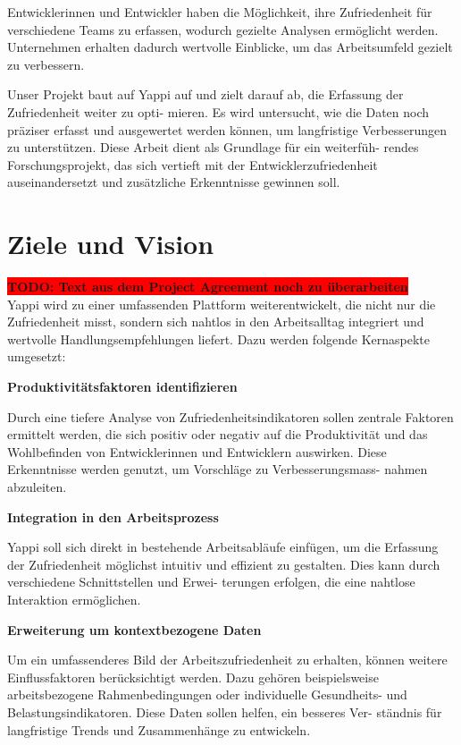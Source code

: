 \documentclass[12pt,a4paper]{report}
\newcommand{\todo}[1]{\colorbox{red}{\textbf{TODO: #1}}\\}
\begin{document}
Entwicklerinnen und Entwickler haben die Möglichkeit, ihre Zufriedenheit für verschiedene Teams zu
erfassen, wodurch gezielte Analysen ermöglicht werden. Unternehmen erhalten dadurch wertvolle
Einblicke, um das Arbeitsumfeld gezielt zu verbessern.

Unser Projekt baut auf Yappi auf und zielt darauf ab, die Erfassung der Zufriedenheit weiter zu opti-
mieren. Es wird untersucht, wie die Daten noch präziser erfasst und ausgewertet werden können,
um langfristige Verbesserungen zu unterstützen. Diese Arbeit dient als Grundlage für ein weiterfüh-
rendes Forschungsprojekt, das sich vertieft mit der Entwicklerzufriedenheit auseinandersetzt und
zusätzliche Erkenntnisse gewinnen soll.

\section{Ziele und Vision}

\todo{Text aus dem Project Agreement noch zu überarbeiten}

Yappi wird zu einer umfassenden Plattform weiterentwickelt, die nicht nur die Zufriedenheit misst,
sondern sich nahtlos in den Arbeitsalltag integriert und wertvolle Handlungsempfehlungen liefert.
Dazu werden folgende Kernaspekte umgesetzt:

\textbf{Produktivitätsfaktoren identifizieren}

Durch eine tiefere Analyse von Zufriedenheitsindikatoren sollen zentrale Faktoren ermittelt werden,
die sich positiv oder negativ auf die Produktivität und das Wohlbefinden von Entwicklerinnen und
Entwicklern auswirken. Diese Erkenntnisse werden genutzt, um Vorschläge zu Verbesserungsmass-
nahmen abzuleiten.

\textbf{Integration in den Arbeitsprozess}

Yappi soll sich direkt in bestehende Arbeitsabläufe einfügen, um die Erfassung der Zufriedenheit
möglichst intuitiv und effizient zu gestalten. Dies kann durch verschiedene Schnittstellen und Erwei-
terungen erfolgen, die eine nahtlose Interaktion ermöglichen.

\textbf{Erweiterung um kontextbezogene Daten}

Um ein umfassenderes Bild der Arbeitszufriedenheit zu erhalten, können weitere Einflussfaktoren
berücksichtigt werden. Dazu gehören beispielsweise arbeitsbezogene Rahmenbedingungen oder
individuelle Gesundheits- und Belastungsindikatoren. Diese Daten sollen helfen, ein besseres Ver-
ständnis für langfristige Trends und Zusammenhänge zu entwickeln.
\end{document}
